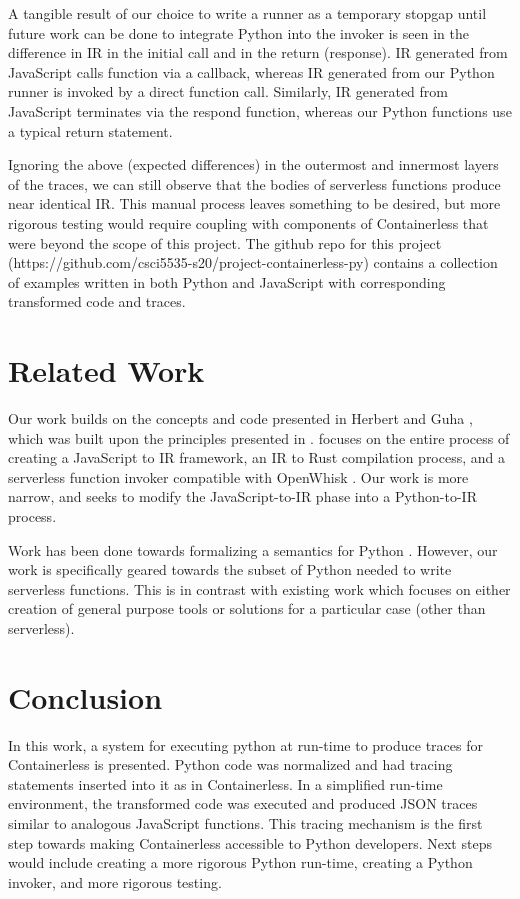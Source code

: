 \documentclass[acmsmall,review,authorversion]{acmart}
\begin{document}
A tangible result of our choice to write a runner as a temporary stopgap until future work can be done to integrate Python into the invoker is seen in the difference in IR in the initial call and in the return (response). IR generated from JavaScript calls function via a callback, whereas IR generated from our Python runner is invoked by a direct function call. Similarly, IR generated from JavaScript terminates via the respond function, whereas our Python functions use a typical return statement.

Ignoring the above (expected differences) in the outermost and innermost layers of the traces, we can still observe that the bodies of serverless functions produce near identical IR. This manual process leaves something to be desired, but more rigorous testing would require coupling with components of Containerless that were beyond the scope of this project. The github repo for this project (https://github.com/csci5535-s20/project-containerless-py) contains a collection of examples written in both Python and JavaScript with corresponding transformed code and traces.

\section{Related Work}
\label{section:relwork}

Our work builds on the concepts and code presented in Herbert and Guha \cite{ServerlessAccel}, which was built upon the principles presented in \cite{FormalFoundations}. \cite{ServerlessAccel} focuses on the entire process of creating a JavaScript to IR framework, an IR to Rust compilation process, and a serverless function invoker compatible with OpenWhisk \cite{OpenWhisk}. Our work is more narrow, and seeks to modify the JavaScript-to-IR phase into a Python-to-IR process.


Work has been done towards formalizing a semantics for Python \cite{pyOpSem}. However, our work is specifically geared towards the subset of Python needed to write serverless functions. This is in contrast with existing work which focuses on either creation of general purpose tools or solutions for a particular case (other than serverless).

\section{Conclusion}
In this work, a system for executing python at run-time to produce traces for Containerless is presented. Python code was normalized and had tracing statements inserted into it as in Containerless. In a simplified run-time environment, the transformed code was executed and produced JSON traces similar to analogous JavaScript functions.  This tracing mechanism is the first step towards making Containerless accessible to Python developers. Next steps would include creating a more rigorous Python run-time, creating a Python invoker, and more rigorous testing.
\end{document}

